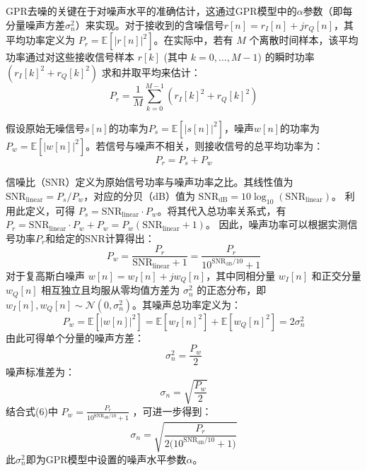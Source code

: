 \documentclass[conference]{IEEEtran}
\begin{document}
GPR去噪的关键在于对噪声水平的准确估计，这通过GPR模型中的$\alpha$参数（即每分量噪声方差$\sigma_n^2$）来实现。对于接收到的含噪信号$r[n]=r_I[n]+jr_Q[n]$，其平均功率定义为 $P_r = \mathbb{E}[|r[n]|^2]$。在实际中，若有 $M$ 个离散时间样本，该平均功率通过对这些接收信号样本 $r[k]$ (其中 $k=0, \ldots, M-1$) 的瞬时功率 $(r_I[k]^2 + r_Q[k]^2)$ 求和并取平均来估计：
\begin{equation}
P_r = \frac{1}{M}\sum_{k=0}^{M-1}(r_I[k]^2+r_Q[k]^2)
\end{equation}

假设原始无噪信号$s[n]$的功率为$P_s = \mathbb{E}[|s[n]|^2]$，噪声$w[n]$的功率为$P_w = \mathbb{E}[|w[n]|^2]$。若信号与噪声不相关，则接收信号的总平均功率为：
\begin{equation}
P_r = P_s + P_w
\end{equation}

信噪比（SNR）定义为原始信号功率与噪声功率之比。其线性值为$\mathrm{SNR}_{\text{linear}} = P_s/P_w$，对应的分贝（dB）值为 $\mathrm{SNR}_{\text{dB}} = 10\log_{10}(\mathrm{SNR}_{\text{linear}})$。
利用此定义，可得 $P_s = \mathrm{SNR}_{\text{linear}} \cdot P_w$。将其代入总功率关系式，有 $P_r = \mathrm{SNR}_{\text{linear}} \cdot P_w + P_w = P_w(\mathrm{SNR}_{\text{linear}} + 1)$。
因此，噪声功率可以根据实测信号功率$P_r$和给定的SNR计算得出：
\begin{equation}
P_w = \frac{P_r}{\mathrm{SNR}_{\text{linear}} + 1} = \frac{P_r}{10^{\mathrm{SNR}_{\text{dB}}/10} + 1}
\end{equation}
对于复高斯白噪声 $w[n]=w_I[n]+jw_Q[n]$，其中同相分量 $w_I[n]$ 和正交分量 $w_Q[n]$ 相互独立且均服从零均值方差为 $\sigma_n^2$ 的正态分布，即 $w_I[n],w_Q[n]\sim\mathcal{N}(0,\sigma_n^2)$。其噪声总功率定义为：
\begin{equation}
P_w=\mathbb{E}[|w[n]|^2]
=\mathbb{E}[w_I[n]^2]+\mathbb{E}[w_Q[n]^2]
=2\sigma_n^2
\end{equation}
由此可得单个分量的噪声方差：
\begin{equation}
\sigma_n^2=\frac{P_w}{2}
\end{equation}
噪声标准差为：
\begin{equation}
\sigma_n=\sqrt{\frac{P_w}{2}}
\end{equation}
结合式(6)中 $P_w=\frac{P_r}{10^{\mathrm{SNR}_{\mathrm{dB}}/10}+1}$ ，可进一步得到：
\begin{equation}
\sigma_n=\sqrt{\frac{P_r}{2\bigl(10^{\mathrm{SNR}_{\mathrm{dB}}/10}+1\bigr)}}
\end{equation}
\label{eq:sigma_n_calc}
此$\sigma_n^2$即为GPR模型中设置的噪声水平参数$\alpha$。
\end{document}

